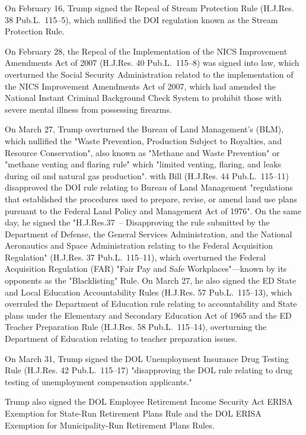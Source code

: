 On February 16, Trump signed the Repeal of Stream Protection Rule
(H.J.Res. 38 Pub.L.~115--5), which nullified the DOI regulation known as
the Stream Protection Rule.

On February 28, the Repeal of the Implementation of the NICS Improvement
Amendments Act of 2007 (H.J.Res. 40 Pub.L.~115--8) was signed into law,
which overturned the Social Security Administration related to the
implementation of the NICS Improvement Amendments Act of 2007, which had
amended the National Instant Criminal Background Check System to
prohibit those with severe mental illness from possessing firearms.

On March 27, Trump overturned the Bureau of Land Management's (BLM),
which nullified the "Waste Prevention, Production Subject to Royalties,
and Resource Conservation", also known as "Methane and Waste Prevention"
or "methane venting and flaring rule" which "limited venting, flaring,
and leaks during oil and natural gas production". with Bill (H.J.Res. 44
Pub.L.~115--11) disapproved the DOI rule relating to Bureau of Land
Management "regulations that established the procedures used to prepare,
revise, or amend land use plans pursuant to the Federal Land Policy and
Management Act of 1976". On the same day, he signed the "H.J.Res.37~--
Disapproving the rule submitted by the Department of Defense, the
General Services Administration, and the National Aeronautics and Space
Administration relating to the Federal Acquisition Regulation" (H.J.Res.
37 Pub.L.~115--11), which overturned the Federal Acquisition Regulation
(FAR) "Fair Pay and Safe Workplaces"---known by its opponents as the
"Blacklisting" Rule. On March 27, he also signed the ED State and Local
Education Accountability Rules (H.J.Res. 57 Pub.L.~115--13), which
overruled the Department of Education rule relating to accountability
and State plans under the Elementary and Secondary Education Act of 1965
and the ED Teacher Preparation Rule (H.J.Res. 58 Pub.L.~115--14),
overturning the Department of Education relating to teacher preparation
issues.

On March 31, Trump signed the DOL Unemployment Insurance Drug Testing
Rule (H.J.Res. 42 Pub.L.~115--17) "disapproving the DOL rule relating to
drug testing of unemployment compensation applicants."

Trump also signed the DOL Employee Retirement Income Security Act ERISA
Exemption for State-Run Retirement Plans Rule and the DOL ERISA
Exemption for Municipality-Run Retirement Plans Rules.

